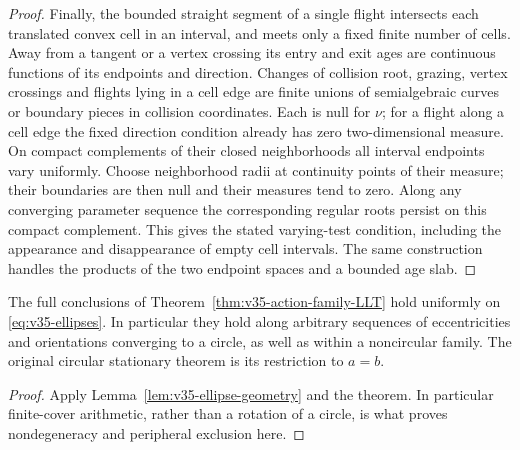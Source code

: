 \begin{proof}
Finally, the bounded straight segment of a single flight intersects
each translated convex cell in an interval, and meets only a fixed
finite number of cells. Away from a tangent or a vertex crossing its
entry and exit ages are continuous functions of its endpoints and
direction. Changes of collision root, grazing, vertex crossings and
flights lying in a cell edge are finite unions of semialgebraic curves
or boundary pieces in collision coordinates. Each is null for $\nu$;
for a flight along a cell edge the fixed direction condition already
has zero two-dimensional measure. On compact complements of their
closed neighborhoods all interval endpoints vary uniformly. Choose
neighborhood radii at continuity points of their measure; their
boundaries are then null and their measures tend to zero. Along any
converging parameter sequence the corresponding regular roots persist
on this compact complement. This gives the stated varying-test
condition, including the appearance and disappearance of empty cell
intervals. The same construction handles the products of the two
endpoint spaces and a bounded age slab.
\end{proof}

\begin{corollary}
\label{cor:v35-ellipse-local-law}
The full conclusions of Theorem~\ref{thm:v35-action-family-LLT} hold
uniformly on \eqref{eq:v35-ellipses}. In particular they hold along
arbitrary sequences of eccentricities and orientations converging to
a circle, as well as within a noncircular family. The original circular
stationary theorem is its restriction to $a=b$.
\end{corollary}
\begin{proof}
Apply Lemma~\ref{lem:v35-ellipse-geometry} and the theorem. In
particular finite-cover arithmetic, rather than a rotation of a circle,
is what proves nondegeneracy and peripheral exclusion here.
\end{proof}

